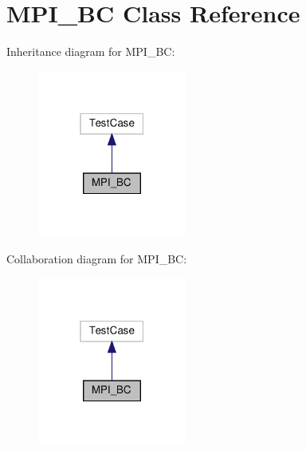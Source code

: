 \hypertarget{classMPI__BC}{}\section{M\+P\+I\+\_\+\+BC Class Reference}
\label{classMPI__BC}


Inheritance diagram for M\+P\+I\+\_\+\+BC\+:\nopagebreak
\begin{figure}[H]
\begin{center}
\leavevmode
\includegraphics[width=139pt]{classMPI__BC__inherit__graph}
\end{center}
\end{figure}


Collaboration diagram for M\+P\+I\+\_\+\+BC\+:\nopagebreak
\begin{figure}[H]
\begin{center}
\leavevmode
\includegraphics[width=139pt]{classMPI__BC__coll__graph}
\end{center}
\end{figure}
